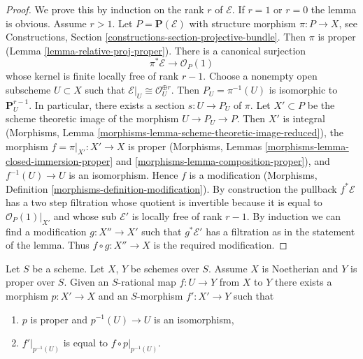 \begin{proof}
We prove this by induction on the rank $r$ of $\mathcal{E}$.
If $r = 1$ or $r = 0$ the lemma is obvious. Assume $r > 1$.
Let $P = \mathbf{P}(\mathcal{E})$ with structure morphism $\pi : P \to X$,
see Constructions, Section \ref{constructions-section-projective-bundle}.
Then $\pi$ is proper (Lemma \ref{lemma-relative-proj-proper}).
There is a canonical surjection
$$
\pi^*\mathcal{E} \to \mathcal{O}_P(1)
$$
whose kernel is finite locally free of rank $r - 1$.
Choose a nonempty open subscheme $U \subset X$ such that
$\mathcal{E}|_U \cong \mathcal{O}_U^{\oplus r}$.
Then $P_U = \pi^{-1}(U)$ is isomorphic to $\mathbf{P}^{r - 1}_U$.
In particular, there exists a section $s : U \to P_U$ of $\pi$.
Let $X' \subset P$ be the scheme theoretic image of the
morphism $U \to P_U \to P$. Then $X'$ is integral
(Morphisms, Lemma \ref{morphisms-lemma-scheme-theoretic-image-reduced}),
the morphism $f = \pi|_{X'} : X' \to X$ is proper (Morphisms, Lemmas
\ref{morphisms-lemma-closed-immersion-proper} and
\ref{morphisms-lemma-composition-proper}), and
$f^{-1}(U) \to U$ is an isomorphism. Hence $f$ is a modification
(Morphisms, Definition \ref{morphisms-definition-modification}).
By construction the pullback $f^*\mathcal{E}$ has a two step
filtration whose quotient is invertible because it is equal to
$\mathcal{O}_P(1)|_{X'}$ and whose sub $\mathcal{E}'$ is locally free of rank
$r - 1$. By induction we can find a modification $g : X'' \to X'$
such that $g^*\mathcal{E}'$ has a filtration as in the statement of
the lemma. Thus $f \circ g : X'' \to X$ is the required modification.
\end{proof}

\begin{lemma}
\label{lemma-extend-rational-map-after-modification}
Let $S$ be a scheme. Let $X$, $Y$ be schemes over $S$.
Assume $X$ is Noetherian and $Y$ is proper over $S$.
Given an $S$-rational map $f : U \to Y$ from $X$ to $Y$
there exists a morphism $p : X' \to X$ and an
$S$-morphism $f' : X' \to Y$ such that
\begin{enumerate}
\item $p$ is proper and $p^{-1}(U) \to U$ is an isomorphism,
\item $f'|_{p^{-1}(U)}$ is equal to $f \circ p|_{p^{-1}(U)}$.
\end{enumerate}
\end{lemma}

